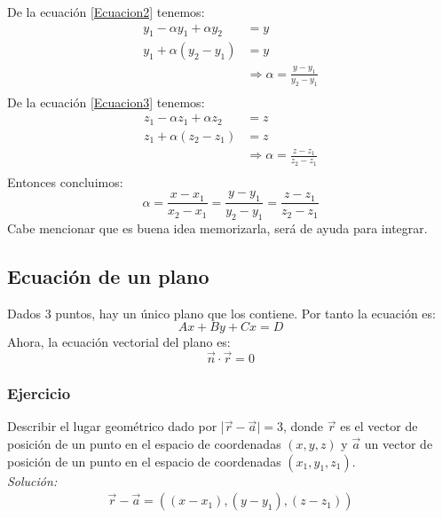 \documentclass[12pt,openany]{book}
\begin{document}
	        De la ecuaci\'on \ref{Ecuacion2} tenemos:
	         \begin{equation*}
	         	\begin{split}
	        		y_{1}- \alpha y_{1} + \alpha y_{2} &= y 				\\
		      			  y_{1}+\alpha (y_{2} - y_{1}) &= y 				\\
		      			&\Rightarrow \alpha= \frac{y-y_{1}}{y_{2} - y_{1}} 	\\
	        	\end{split}
	        \end{equation*}
	        De la ecuaci\'on \ref{Ecuacion3} tenemos:
	         \begin{equation*}
	         	\begin{split}
	        		z_{1}- \alpha z_{1} + \alpha z_{2} &= z 				\\
		      			  z_{1}+\alpha (z_{2} - z_{1}) &= z 				\\
		      			&\Rightarrow \alpha= \frac{z-z_{1}}{z_{2} - z_{1}}  \\
	        	\end{split}
	        \end{equation*}
	        Entonces concluimos:
	        \begin{equation*}	
	        	\alpha=\frac{x-x_{1}}{x_{2} - x_{1}}=\frac{y-y_{1}}{y_{2} - y_{1}}
	        		  =\frac{z-z_{1}}{z_{2} - z_{1}}
	        \end{equation*}
	        Cabe mencionar que es buena idea memorizarla, ser\'a de ayuda para integrar.
		\subsection{Ecuaci\'on de un plano}
			Dados 3 puntos, hay un \'unico plano que los contiene. Por tanto la ecuaci\'on es:
			$$
				Ax+By+Cx=D
			$$
			Ahora, la ecuaci\'on vectorial del plano es:
			$$
				\vec{n}\cdot\vec{r}=0
			$$
	
		 	\subsubsection{Ejercicio}
			 	Describir el lugar geom\'etrico dado por |$\vec{r}-\vec{a}|=3$, donde $\vec{r}$ es el vector de 
			 	posici\'on de un punto en el espacio de coordenadas $(x,y,z)$ y $\vec{a}$ un vector de posici\'on
			 	de un punto en el espacio de coordenadas $(x_{1},y_{1},z_{1})$.\\
			 	\noindent\textsl{Soluci\'on:}\\
				\begin{equation*}
				 	\begin{split}
				 		\vec{r}-\vec{a}=((x-x_{1}),(y-y_{1}),(z-z_{1}))
				 	\end{split}
				\end{equation*}
\end{document}
